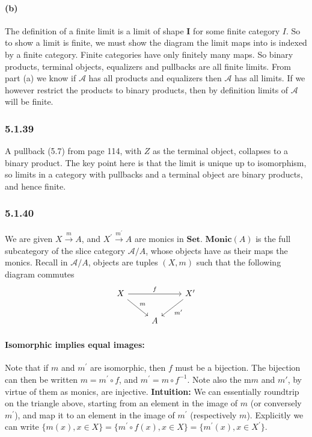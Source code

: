 \documentclass{article}
\begin{document}
\paragraph{(b)}

The definition of a finite limit is a limit of shape $\mathbf{I}$ for some finite category $I$. So to show a limit is finite, we must show the diagram the limit maps into is indexed by a finite category. Finite categories have only finitely many maps. So binary products, terminal objects, equalizers and pullbacks are all finite limits. From part (a) we know if $\mathcal{A}$ has all products and equalizers then $\mathcal{A}$ has all limits. If we however restrict the products to binary products, then by definition limits of $\mathcal{A}$ will be finite.

\subsubsection*{5.1.39}

A pullback (5.7) from page 114, with $Z$ as the terminal object, collapses to a binary product. The key point here is that the limit is unique up to isomorphism, so limits in a category with pullbacks and a terminal object are binary products, and hence finite.

\subsubsection*{5.1.40}

We are given $X \xrightarrow{m} A$, and $X^\prime \xrightarrow{m^\prime} A$ are monics in $\mathbf{Set}$. $\mathbf{Monic}(A)$ is the full subcategory of the slice category $\mathcal{A} / A$, whose objects have as their maps the monics. Recall in $\mathcal {A}/A$, objects are tuples $(X, m)$ such that the following diagram commutes
\begin{equation*}
\begin{tikzcd}
X \arrow{dr}{m} \arrow{rr}{f}
& & X^\prime \arrow{dl}{m^\prime} \\
& A
\end{tikzcd}
\end{equation*}

\paragraph{Isomorphic implies equal images:}
Note that if $m$ and $m^\prime$ are isomorphic, then $f$ must be a bijection. The bijection can then be written $m = m^\prime \circ f$, and $m^\prime = m \circ f^{-1}$. Note also the m$m$ and $m\prime$, by virtue of them as monics, are injective. \textbf{Intuition:} We can essentially roundtrip on the triangle above, starting from an element in the image of $m$ (or conversely $m^\prime$), and map it to an element in the image of $m^\prime$ (respectively $m$).  Explicitly we can write $\{ m(x), x \in X \} = \{ m^\prime \circ f (x), x \in X \} = \{ m^\prime (x), x \in X^\prime \}$.
\end{document}
